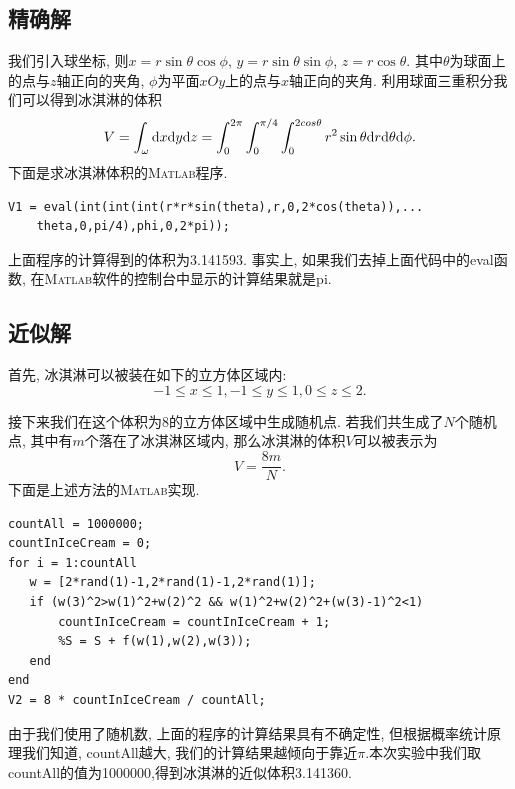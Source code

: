 \documentclass[a4paper,12pt]{article}
\begin{document}
\begin{CJK*}{UTF8}{gbsn}
\subsection{精确解}
我们引入球坐标, 则$x=r\sin{\theta}\cos{\phi}$, $y=r\sin{\theta}\sin{\phi}$, $z=r\cos{\theta}$. 其中$\theta$为球面上的点与$z$轴正向的夹角, $\phi$为平面$xOy$上的点与$x$轴正向的夹角. 利用球面三重积分我们可以得到冰淇淋的体积
\begin{equation*}
V=\int^{}_{\omega}{\rm d}x{\rm d}y{\rm d}z=\int^{2\pi}_{0}\int^{\pi/4}_{0}\int^{2cos{\theta}}_{0}r^2\sin{\theta}{\rm d}r{\rm d}\theta{\rm d}\phi.
\end{equation*}
下面是求冰淇淋体积的\textsc{Matlab}程序.\par\vspace{-15pt}
\begin{lstlisting}
V1 = eval(int(int(int(r*r*sin(theta),r,0,2*cos(theta)),...
    theta,0,pi/4),phi,0,2*pi));
\end{lstlisting}\par
上面程序的计算得到的体积为3.141593. 事实上, 如果我们去掉上面代码中的eval函数, 在\textsc{Matlab}软件的控制台中显示的计算结果就是pi.
\subsection{近似解}
首先, 冰淇淋可以被装在如下的立方体区域内:
\begin{equation*}
-1 \leqslant x \leqslant 1, -1 \leqslant y \leqslant 1, 0 \leqslant z \leqslant 2.
\end{equation*}\par
接下来我们在这个体积为8的立方体区域中生成随机点. 若我们共生成了$N$个随机点, 其中有$m$个落在了冰淇淋区域内, 那么冰淇淋的体积$V$可以被表示为
\begin{equation*}
V=\frac{8m}{N}.
\end{equation*}
下面是上述方法的\textsc{Matlab}实现.\par\vspace{-15pt}
\begin{lstlisting}
countAll = 1000000;
countInIceCream = 0;
for i = 1:countAll
   w = [2*rand(1)-1,2*rand(1)-1,2*rand(1)];
   if (w(3)^2>w(1)^2+w(2)^2 && w(1)^2+w(2)^2+(w(3)-1)^2<1)
       countInIceCream = countInIceCream + 1;
       %S = S + f(w(1),w(2),w(3));
   end
end
V2 = 8 * countInIceCream / countAll;
\end{lstlisting}\par
由于我们使用了随机数, 上面的程序的计算结果具有不确定性, 但根据概率统计原理我们知道, countAll越大, 我们的计算结果越倾向于靠近$\pi$.本次实验中我们取countAll的值为1000000,得到冰淇淋的近似体积3.141360.

\end{CJK*}
\end{document}
